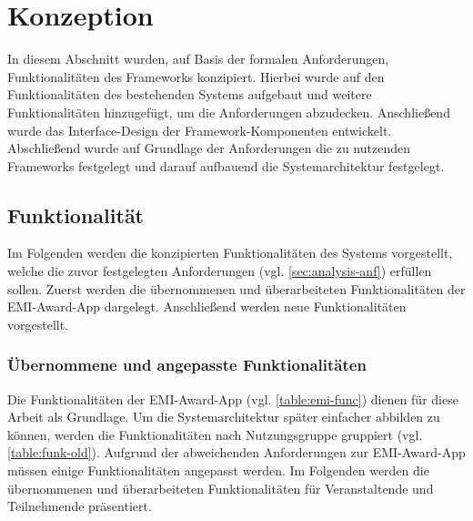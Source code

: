 \chapter{Konzeption} \label{chapter:conception}

In diesem Abschnitt wurden, auf Basis der formalen Anforderungen,
Funktionalitäten des Frameworks konzipiert. Hierbei wurde auf den
Funktionalitäten des bestehenden Systems aufgebaut und weitere Funktionalitäten
hinzugefügt, um die Anforderungen abzudecken. Anschließend wurde das
Interface-Design der Frame\-work-Kom\-po\-nen\-ten entwickelt. Abschließend
wurde auf Grundlage der Anforderungen die zu nutzenden Frameworks festgelegt und
darauf aufbauend die Systemarchitektur festgelegt.

\section{Funktionalität} \label{sec:concept-func}

Im Folgenden werden die konzipierten Funktionalitäten des Systems
vorgestellt, welche die zuvor festgelegten Anforderungen (vgl.
\autoref{sec:analysis-anf}) erfüllen sollen. Zuerst werden die übernommenen und
überarbeiteten Funktionalitäten der EMI-Award-App dargelegt. Anschließend werden
neue Funktionalitäten vorgestellt.

\subsection{Übernommene und angepasste Funktionalitäten}

Die Funktionalitäten der EMI-Award-App (vgl. \autoref{table:emi-func}) dienen für
diese Arbeit als Grundlage. Um die Systemarchitektur später einfacher abbilden
zu können, werden die Funktionalitäten nach Nutzungsgruppe gruppiert (vgl.
\autoref{table:funk-old}). Aufgrund der abweichenden Anforderungen zur
EMI-Award-App müssen einige Funktionalitäten angepasst werden. Im Folgenden
werden die übernommenen und überarbeiteten Funktionalitäten für Veranstaltende
und Teilnehmende präsentiert.

